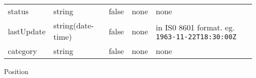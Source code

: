 \documentclass[
]{article}
\begin{document}
\begin{longtable}[]{@{}lllll@{}}
\begin{minipage}[t]{0.17\columnwidth}
status\strut
\end{minipage} & \begin{minipage}[t]{0.17\columnwidth}\raggedright
string\strut
\end{minipage} & \begin{minipage}[t]{0.17\columnwidth}\raggedright
false\strut
\end{minipage} & \begin{minipage}[t]{0.17\columnwidth}\raggedright
none\strut
\end{minipage} & \begin{minipage}[t]{0.17\columnwidth}\raggedright
none\strut
\end{minipage}\tabularnewline
\begin{minipage}[t]{0.17\columnwidth}\raggedright
lastUpdate\strut
\end{minipage} & \begin{minipage}[t]{0.17\columnwidth}\raggedright
string(date-time)\strut
\end{minipage} & \begin{minipage}[t]{0.17\columnwidth}\raggedright
false\strut
\end{minipage} & \begin{minipage}[t]{0.17\columnwidth}\raggedright
none\strut
\end{minipage} & \begin{minipage}[t]{0.17\columnwidth}\raggedright
in IS0 8601 format. eg. \texttt{1963-11-22T18:30:00Z}\strut
\end{minipage}\tabularnewline
\begin{minipage}[t]{0.17\columnwidth}\raggedright
category\strut
\end{minipage} & \begin{minipage}[t]{0.17\columnwidth}\raggedright
string\strut
\end{minipage} & \begin{minipage}[t]{0.17\columnwidth}\raggedright
false\strut
\end{minipage} & \begin{minipage}[t]{0.17\columnwidth}\raggedright
none\strut
\end{minipage} & \begin{minipage}[t]{0.17\columnwidth}\raggedright
none\strut
\end{minipage}\tabularnewline
\bottomrule
\end{longtable}

Position
\end{document}
